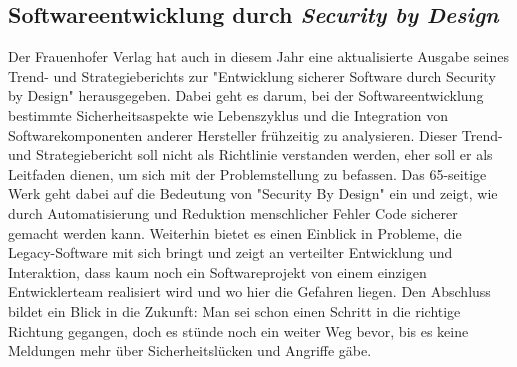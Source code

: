 \subsection{Softwareentwicklung durch \textit{Security by Design}}
Der Frauenhofer Verlag hat auch in diesem Jahr eine aktualisierte 
Ausgabe seines Trend- und Strategieberichts zur "Entwicklung sicherer 
Software durch Security by Design" %
herausgegeben.
Dabei geht es darum, bei der Softwareentwicklung bestimmte
Sicherheitsaspekte wie Lebenszyklus und die Integration von 
Softwarekomponenten anderer Hersteller frühzeitig zu analysieren.
Dieser Trend- und Strategiebericht soll nicht als Richtlinie verstanden
werden, eher soll er als Leitfaden dienen, um sich mit der Problemstellung
zu befassen.
Das 65-seitige Werk geht dabei auf die Bedeutung von "Security By Design" ein
und zeigt, wie durch Automatisierung und Reduktion menschlicher Fehler
Code sicherer gemacht werden kann. Weiterhin bietet es einen Einblick
in Probleme, die Legacy-Software mit sich bringt und zeigt an verteilter 
Entwicklung und Interaktion, dass kaum noch ein Softwareprojekt von einem
einzigen Entwicklerteam realisiert wird und wo hier die Gefahren liegen.
Den Abschluss bildet ein Blick in die Zukunft: Man sei schon einen Schritt in die richtige Richtung gegangen, doch es  
stünde noch ein weiter Weg bevor, bis es keine Meldungen mehr 
über Sicherheitslücken und Angriffe gäbe.
